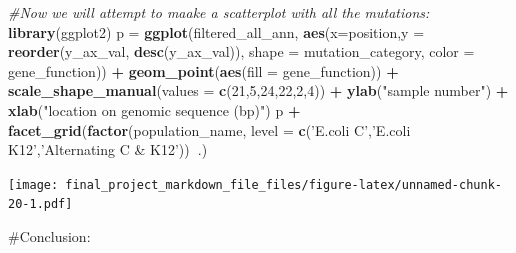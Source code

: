 \documentclass[
]{article}
\newenvironment{Shaded}{\begin{snugshade}}{\end{snugshade}}
\newcommand{\CommentTok}[1]{\textcolor[rgb]{0.56,0.35,0.01}{\textit{#1}}}
\newcommand{\DataTypeTok}[1]{\textcolor[rgb]{0.13,0.29,0.53}{#1}}
\newcommand{\DecValTok}[1]{\textcolor[rgb]{0.00,0.00,0.81}{#1}}
\newcommand{\KeywordTok}[1]{\textcolor[rgb]{0.13,0.29,0.53}{\textbf{#1}}}
\newcommand{\NormalTok}[1]{#1}
\newcommand{\OperatorTok}[1]{\textcolor[rgb]{0.81,0.36,0.00}{\textbf{#1}}}
\newcommand{\StringTok}[1]{\textcolor[rgb]{0.31,0.60,0.02}{#1}}
\begin{document}
\begin{Shaded}
\begin{Highlighting}[]
\CommentTok{#Now we will attempt to maake a scatterplot with all the mutations: }
\KeywordTok{library}\NormalTok{(ggplot2)}
\NormalTok{p =}\StringTok{ }\KeywordTok{ggplot}\NormalTok{(filtered_all_ann, }\KeywordTok{aes}\NormalTok{(}\DataTypeTok{x=}\NormalTok{position,}\DataTypeTok{y =} \KeywordTok{reorder}\NormalTok{(y_ax_val, }\KeywordTok{desc}\NormalTok{(y_ax_val)), }\DataTypeTok{shape =}\NormalTok{ mutation_category, }\DataTypeTok{color =}\NormalTok{ gene_function)) }\OperatorTok{+}\StringTok{ }\KeywordTok{geom_point}\NormalTok{(}\KeywordTok{aes}\NormalTok{(}\DataTypeTok{fill =}\NormalTok{ gene_function)) }\OperatorTok{+}\StringTok{ }\KeywordTok{scale_shape_manual}\NormalTok{(}\DataTypeTok{values =} \KeywordTok{c}\NormalTok{(}\DecValTok{21}\NormalTok{,}\DecValTok{5}\NormalTok{,}\DecValTok{24}\NormalTok{,}\DecValTok{22}\NormalTok{,}\DecValTok{2}\NormalTok{,}\DecValTok{4}\NormalTok{)) }\OperatorTok{+}\StringTok{ }\KeywordTok{ylab}\NormalTok{(}\StringTok{"sample number"}\NormalTok{) }\OperatorTok{+}\StringTok{ }\KeywordTok{xlab}\NormalTok{(}\StringTok{"location on genomic sequence (bp)"}\NormalTok{)}
\NormalTok{p }\OperatorTok{+}\StringTok{ }\KeywordTok{facet_grid}\NormalTok{(}\KeywordTok{factor}\NormalTok{(population_name, }\DataTypeTok{level =} \KeywordTok{c}\NormalTok{(}\StringTok{'E.coli C'}\NormalTok{,}\StringTok{'E.coli K12'}\NormalTok{,}\StringTok{'Alternating C & K12'}\NormalTok{))}\OperatorTok{~}\NormalTok{.)}
\end{Highlighting}
\end{Shaded}

\texttt{[image: final\_project\_markdown\_file\_files/figure-latex/unnamed-chunk-20-1.pdf]}

\#Conclusion:
\end{document}
